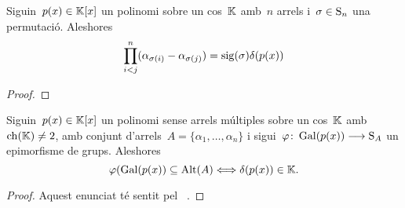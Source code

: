 \documentclass[../Apunts.tex]{subfiles}
\begin{document}
	\begin{lemma}
		\label{lema:discriminant}
		Siguin~\(p(x)\in\mathbb{K}[x]\) un polinomi sobre un cos~\(\mathbb{K}\) amb~\(n\) arrels i~\(\sigma\in\operatorname{S}_{n}\) una permutació. Aleshores
		\[\prod_{i<j}^{n}(\alpha_{\sigma(i)}-\alpha_{\sigma(j)})=\operatorname{sig}(\sigma)\delta(p(x))\]
		\begin{proof}
		\end{proof}
	\end{lemma}
	\begin{corollary}
		\label{cor:l'arrel del discriminant d'un polinomi pertany al cos si i només si el grup de Galois del polinomi és un subgrup dels alternats de les arrels}
		Siguin~\(p(x)\in\mathbb{K}[x]\) un polinomi sense arrels múltiples sobre un cos~\(\mathbb{K}\) amb~\(\operatorname{ch}(\mathbb{K})\neq2\), amb conjunt d'arrels~\(A=\{\alpha_{1},\dots,\alpha_{n}\}\) i sigui~\(\varphi\colon\operatorname{Gal}(p(x))\longrightarrow\operatorname{S}_{A}\) un epimorfisme de grups.
		Aleshores
		\[\varphi(\operatorname{Gal}(p(x))\subseteq\operatorname{Alt}(A)\Longleftrightarrow\delta(p(x))\in\mathbb{K}.\]
		\begin{proof}
			Aquest enunciat té sentit pel \corollari~.
		\end{proof}
	\end{corollary}
	
	
\end{document}
